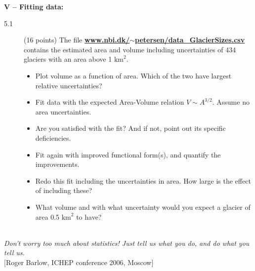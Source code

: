\documentclass[11pt]{article}
\begin{document}

\noindent
{\bf V -- Fitting data:}
\begin{description}
\item[5.1] (16 points)
  The file
  \href{http://www.nbi.dk/~petersen/data\_GlacierSizes.txt}{\bf www.nbi.dk/$\sim$petersen/data\_GlacierSizes.csv}
  contains the estimated area and volume including uncertainties of 434 glaciers with an area above 1 $\mbox{km}^2$.
  \vspace{-1.0ex}
  \begin{itemize}
    \item Plot volume as a function of area. Which of the two have largest relative uncertainties?
    \item Fit data with the expected Area-Volume relation $V \sim A^{3/2}$. Assume no area uncertainties.
    \item Are you satisfied with the fit? And if not, point out its specific deficiencies.
    \item Fit again with improved functional form(s), and quantify the improvements.
    \item Redo this fit including the uncertainties in area. How large is the effect of including these?
    \item What volume and with what uncertainty would you expect a glacier of area 0.5 $\mbox{km}^2$ to have?
  \end{itemize}
\end{description}

\noindent
\hrulefill\\
\emph{Don't worry too much about statistics! Just tell us what you do, and do what you tell us.}\\
  \phantom{foobar} \hfill [Roger Barlow, ICHEP conference 2006, Moscow]\\[-2ex]


\end{document}
